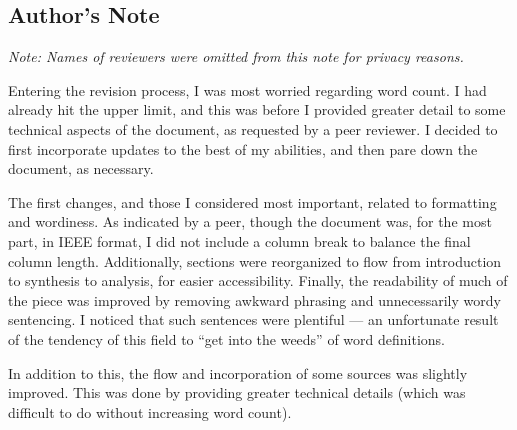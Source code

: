\documentclass[conference]{IEEEtran}
\begin{document}
\begin{center}
  \begin{tcolorbox}

    \section*{Author's Note}

    \justifying
    \hspace{.25 in}\textit{Note: Names of reviewers were omitted from this note for privacy reasons.}
    \vspace{-10pt}
    \begin{center}
    \end{center}
    \justifying
    \hspace{.25 in}    Entering the revision process, I was most worried regarding word count. I had already hit the upper limit, and this was before I provided greater detail to some technical aspects of the document, as requested by a peer reviewer. I decided to first incorporate updates to the best of my abilities, and then pare down the document, as necessary.\\
    \vspace{-35pt}
    \begin{center}
    \end{center}
    \justifying
    \hspace{.25 in}    The first changes, and those I considered most important, related to formatting and wordiness. As indicated by a peer, though the document was, for the most part, in IEEE format, I did not include a column break to balance the final column length. Additionally, sections were reorganized to flow from introduction to synthesis to analysis, for easier accessibility. Finally, the readability of much of the piece was improved by removing awkward phrasing and unnecessarily wordy sentencing. I noticed that such sentences were plentiful — an unfortunate result of the tendency of this field to ``get into the weeds'' of word definitions.\\
    \vspace{-35pt}
    \begin{center}
    \end{center}
    \justifying
    \hspace{.25 in}    In addition to this, the flow and incorporation of some sources was slightly improved. This was done by providing greater technical details (which was difficult to do without increasing word count).
    \vspace{-25pt}

\end{tcolorbox}
\end{center}
\end{document}
